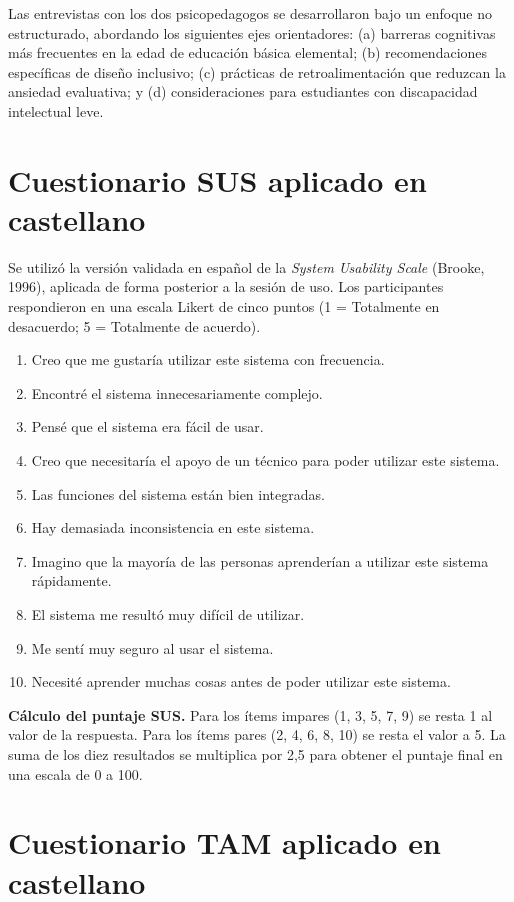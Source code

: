 Las entrevistas con los dos psicopedagogos se desarrollaron bajo un enfoque no estructurado, abordando los siguientes ejes orientadores: (a) barreras cognitivas más frecuentes en la edad de educación básica elemental; (b) recomendaciones específicas de diseño inclusivo; (c) prácticas de retroalimentación que reduzcan la ansiedad evaluativa; y (d) consideraciones para estudiantes con discapacidad intelectual leve.

\section{Cuestionario SUS aplicado en castellano}

Se utilizó la versión validada en español de la \textit{System Usability Scale} (Brooke, 1996), aplicada de forma posterior a la sesión de uso. Los participantes respondieron en una escala Likert de cinco puntos (1 = Totalmente en desacuerdo; 5 = Totalmente de acuerdo).

\begin{enumerate}[leftmargin=*]
\item Creo que me gustaría utilizar este sistema con frecuencia.
\item Encontré el sistema innecesariamente complejo.
\item Pensé que el sistema era fácil de usar.
\item Creo que necesitaría el apoyo de un técnico para poder utilizar este sistema.
\item Las funciones del sistema están bien integradas.
\item Hay demasiada inconsistencia en este sistema.
\item Imagino que la mayoría de las personas aprenderían a utilizar este sistema rápidamente.
\item El sistema me resultó muy difícil de utilizar.
\item Me sentí muy seguro al usar el sistema.
\item Necesité aprender muchas cosas antes de poder utilizar este sistema.
\end{enumerate}

\textbf{Cálculo del puntaje SUS.} Para los ítems impares (1, 3, 5, 7, 9) se resta 1 al valor de la respuesta. Para los ítems pares (2, 4, 6, 8, 10) se resta el valor a 5. La suma de los diez resultados se multiplica por 2,5 para obtener el puntaje final en una escala de 0 a 100.

\section{Cuestionario TAM aplicado en castellano}

